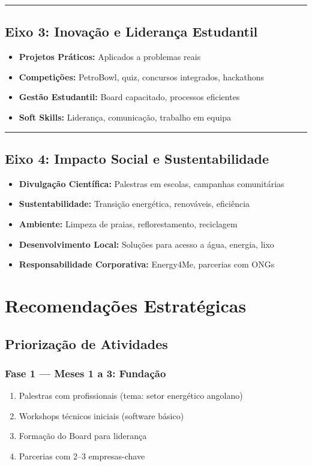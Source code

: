 \documentclass[12pt,a4paper]{article}
\newcommand{\proposalsep}{%
  \vspace{6pt}%
  {\color{gold}\rule{0.35\linewidth}{0.7pt}}%
  \vspace{4pt}%
}
\begin{document}
\proposalsep

\subsection{Eixo 3: Inovação e Liderança Estudantil}

\begin{itemize}
    \item \textbf{Projetos Práticos:} Aplicados a problemas reais
    \item \textbf{Competições:} PetroBowl, quiz, concursos integrados, hackathons
    \item \textbf{Gestão Estudantil:} Board capacitado, processos eficientes
    \item \textbf{Soft Skills:} Liderança, comunicação, trabalho em equipa
\end{itemize}

\proposalsep

\subsection{Eixo 4: Impacto Social e Sustentabilidade}

\begin{itemize}
    \item \textbf{Divulgação Científica:} Palestras em escolas, campanhas comunitárias
    \item \textbf{Sustentabilidade:} Transição energética, renováveis, eficiência
    \item \textbf{Ambiente:} Limpeza de praias, reflorestamento, reciclagem
    \item \textbf{Desenvolvimento Local:} Soluções para acesso a água, energia, lixo
    \item \textbf{Responsabilidade Corporativa:} Energy4Me, parcerias com ONGs
\end{itemize}

\newpage
\section{Recomendações Estratégicas}

\subsection{Priorização de Atividades}

\subsubsection*{Fase 1 — Meses 1 a 3: Fundação}
\begin{enumerate}
    \item Palestras com profissionais (tema: setor energético angolano)
    \item Workshops técnicos iniciais (software básico)
    \item Formação do Board para liderança
    \item Parcerias com 2–3 empresas-chave
\end{enumerate}
\end{document}
